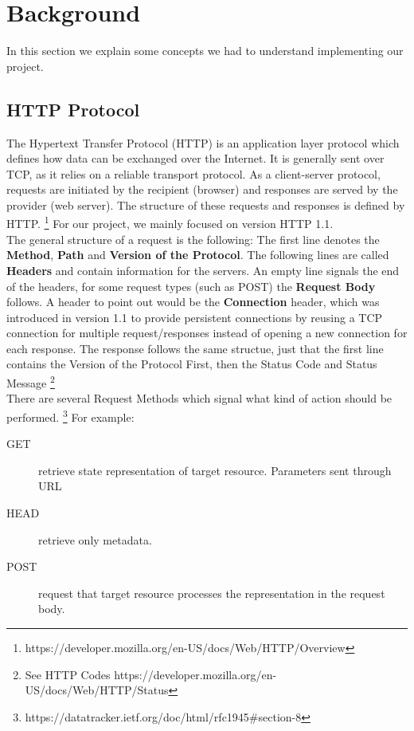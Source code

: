 \section*{Background}
In this section we explain some concepts we had to understand implementing our project. 

\subsection*{HTTP Protocol}
The Hypertext Transfer Protocol (HTTP) is an application layer protocol which defines how data can be exchanged over the Internet. It is generally sent over TCP, as it relies on a reliable transport protocol. 
As a client-server protocol, requests are initiated by the recipient (browser) and responses are served by the provider (web server). The structure of these requests and responses is defined by HTTP. \footnote{https://developer.mozilla.org/en-US/docs/Web/HTTP/Overview} For our project, we mainly focused on version HTTP 1.1. \\

The general structure of a request is the following: The first line denotes the \textbf{Method}, \textbf{Path} and \textbf{Version of the Protocol}. The following lines are called \textbf{Headers} and contain information for the servers. An empty line signals the end of the headers, for some request types (such as POST) the \textbf{Request Body} follows. A header to point out would be the \textbf{Connection} header, which was introduced in version 1.1 to provide persistent connections by reusing a TCP connection for multiple request/responses instead of opening a new connection for each response. The response follows the same structue, just that the first line contains the Version of the Protocol First, then the Status Code and Status Message \footnote{See HTTP Codes https://developer.mozilla.org/en-US/docs/Web/HTTP/Status} \\

There are several Request Methods which signal what kind of action should be performed. \footnote{https://datatracker.ietf.org/doc/html/rfc1945\#section-8} For example: 
\begin{description}
    \item[GET]retrieve state representation of target resource. Parameters sent through URL %
    \item[HEAD]retrieve only metadata. 
    \item[POST]request that target resource processes the representation in the request body. 
\end{description}

